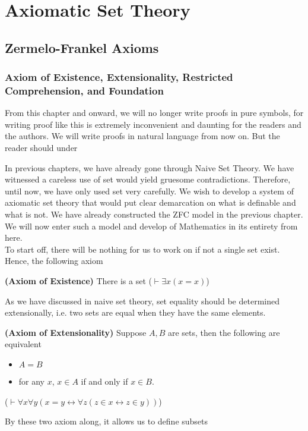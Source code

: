 \chapter{Axiomatic Set Theory}
\section{Zermelo-Frankel Axioms}
\subsection{Axiom of Existence, Extensionality, Restricted Comprehension, and Foundation}
\begin{rem}
    From this chapter and onward, we will no longer write proofs in pure symbols, for writing proof like this is extremely inconvenient and daunting for the readers and the authors. We will write proofs in natural language from now on. But the reader should under
\end{rem}
In previous chapters, we have already gone through Naive Set Theory. We have witnessed a careless use of set would yield gruesome contradictions. Therefore, until now, we have only used set very carefully. We wish to develop a system of axiomatic set theory that would put clear demarcation on what is definable and what is not. We have already constructed the ZFC model in the previous chapter. We will now enter such a model and develop of Mathematics in its entirety from here.\\

To start off, there will be nothing for us to work on if not a single set exist. Hence, the following axiom
\begin{ax}
    \textbf{(Axiom of Existence)} There is a set ($\vdash \exists x(x=x)$)
\end{ax}
As we have discussed in naive set theory, set equality should be determined extensionally, i.e. two sets are equal when they have the same elements. 
\begin{ax}
    \textbf{(Axiom of Extensionality)} Suppose $A,B$ are sets, then the following are equivalent
    \begin{itemize}
        \item $A = B$
        \item for any $x$, $x\in A$ if and only if $x\in B$.
    \end{itemize}
    ($\vdash \forall x\forall y (x=y\leftrightarrow \forall z(z\in x\leftrightarrow z\in y))$)
\end{ax}
By these two axiom along, it allows us to define subsets 

